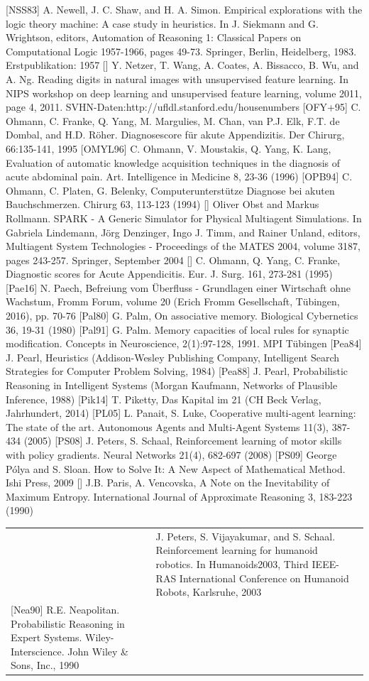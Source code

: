 \documentclass[10pt]{book}
\begin{document}
\begin{center}
[NSS83] A. Newell, J. C. Shaw, and H. A. Simon. Empirical explorations with the logic theory machine: A case study in heuristics. In J. Siekmann and G. Wrightson, editors, Automation of Reasoning 1: Classical Papers on Computational Logic 1957-1966, pages 49-73. Springer, Berlin, Heidelberg, 1983. Erstpublikation: 1957
[\cite{nwc11}] Y. Netzer, T. Wang, A. Coates, A. Bissacco, B. Wu, and A. Ng. Reading digits in natural images with unsupervised feature learning. In NIPS workshop on deep learning and unsupervised feature learning, volume 2011, page 4, 2011. SVHN-Daten:http://ufldl.stanford.edu/housenumbers
[OFY+95] C. Ohmann, C. Franke, Q. Yang, M. Margulies, M. Chan, van P.J. Elk, F.T. de Dombal, and H.D. Röher. Diagnosescore für akute Appendizitis. Der Chirurg, 66:135-141, 1995
[OMYL96] C. Ohmann, V. Moustakis, Q. Yang, K. Lang, Evaluation of automatic knowledge acquisition techniques in the diagnosis of acute abdominal pain. Art. Intelligence in Medicine 8, 23-36 (1996)
[OPB94] C. Ohmann, C. Platen, G. Belenky, Computerunterstütze Diagnose bei akuten Bauchschmerzen. Chirurg 63, 113-123 (1994)
[\cite{or04}] Oliver Obst and Markus Rollmann. SPARK - A Generic Simulator for Physical Multiagent Simulations. In Gabriela Lindemann, Jörg Denzinger, Ingo J. Timm, and Rainer Unland, editors, Multiagent System Technologies - Proceedings of the MATES 2004, volume 3187, pages 243-257. Springer, September 2004
[\cite{oyf95}] C. Ohmann, Q. Yang, C. Franke, Diagnostic scores for Acute Appendicitis. Eur. J. Surg. 161, 273-281 (1995)
[Pae16] N. Paech, Befreiung vom Überfluss - Grundlagen einer Wirtschaft ohne Wachstum, Fromm Forum, volume 20 (Erich Fromm Gesellschaft, Tübingen, 2016), pp. 70-76
[Pal80] G. Palm, On associative memory. Biological Cybernetics 36, 19-31 (1980)
[Pal91] G. Palm. Memory capacities of local rules for synaptic modification. Concepts in Neuroscience, 2(1):97-128, 1991. MPI Tübingen
[Pea84] J. Pearl, Heuristics (Addison-Wesley Publishing Company, Intelligent Search Strategies for Computer Problem Solving, 1984)
[Pea88] J. Pearl, Probabilistic Reasoning in Intelligent Systems (Morgan Kaufmann, Networks of Plausible Inference, 1988)
[Pik14] T. Piketty, Das Kapital im 21 (CH Beck Verlag, Jahrhundert, 2014)
[PL05] L. Panait, S. Luke, Cooperative multi-agent learning: The state of the art. Autonomous Agents and Multi-Agent Systems 11(3), 387-434 (2005)
[PS08] J. Peters, S. Schaal, Reinforcement learning of motor skills with policy gradients. Neural Networks 21(4), 682-697 (2008)
[PS09] George Pólya and S. Sloan. How to Solve It: A New Aspect of Mathematical Method. Ishi Press, 2009
[\cite{pv90}] J.B. Paris, A. Vencovska, A Note on the Inevitability of Maximum Entropy. International Journal of Approximate Reasoning 3, 183-223 (1990)
\begin{tabular}{|l|l|}
\hline [\cite{pvs03}] & J. Peters, S. Vijayakumar, and S. Schaal. Reinforcement learning for humanoid robotics. In Humanoids2003, Third IEEE-RAS International Conference on Humanoid Robots, Karlsruhe, 2003 \\
[Nea90] R.E. Neapolitan. Probabilistic Reasoning in Expert Systems. Wiley-Interscience. John Wiley \& Sons, Inc., 1990


\end{tabular}
\end{center}
\end{document}
